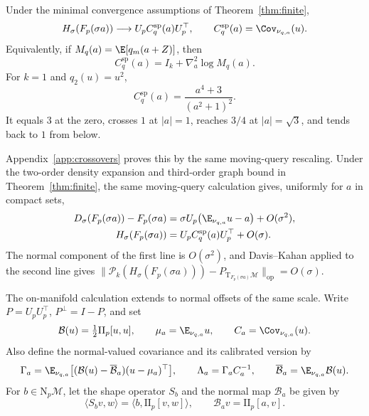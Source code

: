 \documentclass[10pt]{article}
\theoremstyle{c2fup}
\newcommand{\M}{\mathcal{M}}
\newcommand{\T}{\mathrm{T}}
\newcommand{\N}{\mathrm{N}}
\newcommand{\op}{\mathrm{op}}
\begin{document}
\begin{proposition}
\label{prop:spatial}
Under the minimal convergence assumptions of Theorem~\ref{thm:finite},
\begin{equation}
  H_\sigma(F_p(\sigma a))
  \longrightarrow U_p C_q^{\mathrm{sp}}(a)U_p^\top,
  \qquad
  C_q^{\mathrm{sp}}(a)=\Cov_{\nu_{q,a}}(u).
  \label{eq:spatial}
\end{equation}
Equivalently, if $M_q(a)=\E[q_m(a+Z)]$, then
\begin{equation}
  C_q^{\mathrm{sp}}(a)=I_k+\nabla_a^2\log M_q(a).
\end{equation}
For $k=1$ and $q_2(u)=u^2$,
\begin{equation}
  C_q^{\mathrm{sp}}(a)=\frac{a^4+3}{(a^2+1)^2}.
  \label{eq:spatial-quadratic}
\end{equation}
It equals $3$ at the zero, crosses $1$ at $|a|=1$, reaches $3/4$ at $|a|=\sqrt3$, and tends back to $1$ from below.
\end{proposition}

Appendix~\ref{app:crossovers} proves this by the same moving-query rescaling.
Under the two-order density expansion and third-order graph bound in
Theorem~\ref{thm:finite}, the same moving-query calculation gives, uniformly for $a$ in compact sets,
\begin{align}
  D_\sigma(F_p(\sigma a))-F_p(\sigma a)
  &=\sigma U_p\bigl(\E_{\nu_{q,a}}u-a\bigr)+O(\sigma^2),
  \label{eq:spatial-mean-rate}\\
  H_\sigma(F_p(\sigma a))
  &=U_pC_q^{\mathrm{sp}}(a)U_p^\top+O(\sigma).
  \label{eq:spatial-h-rate}
\end{align}
The normal component of the first line is $O(\sigma^2)$, and Davis--Kahan applied to the second line gives
$\|\mathcal P_k(H_\sigma(F_p(\sigma a)))-P_{\T_{F_p(\sigma a)}\M}\|_\op=O(\sigma)$.

The on-manifold calculation extends to normal offsets of the same scale.
Write $P=U_pU_p^\top$, $P^\perp=I-P$, and set
\begin{equation}
  \mathcal B(u)=\tfrac12\mathrm{II}_p[u,u],
  \qquad
  \mu_a=\E_{\nu_{q,a}}u,
  \qquad
  C_a=\Cov_{\nu_{q,a}}(u).
\end{equation}
Also define the normal-valued covariance and its calibrated version by
\begin{equation}
  \Gamma_a
  =\E_{\nu_{q,a}}
  \bigl[(\mathcal B(u)-\overline{\mathcal B}_a)
        (u-\mu_a)^\top\bigr],
  \qquad
  \Lambda_a=\Gamma_aC_a^{-1},
  \qquad
  \overline{\mathcal B}_a=\E_{\nu_{q,a}}\mathcal B(u).
  \label{eq:normal-boundary-objects}
\end{equation}
For $b\in\N_p\M$, let the shape operator $S_b$ and the normal map
$\mathcal B_a$ be given by
\begin{equation}
  \langle S_bv,w\rangle
  =\langle b,\mathrm{II}_p[v,w]\rangle,
  \qquad
  \mathcal B_av=\mathrm{II}_p[a,v].
  \label{eq:shape-convention}
\end{equation}
\end{document}
